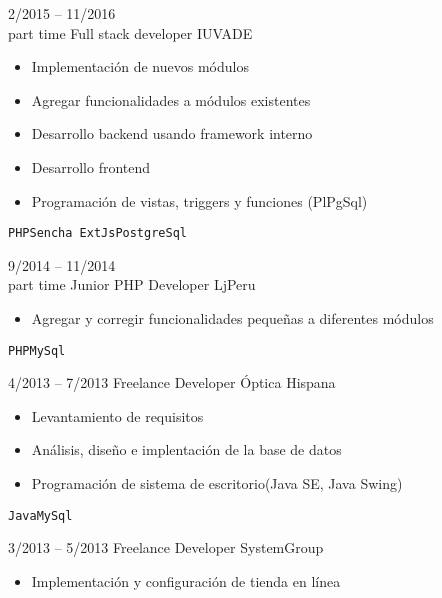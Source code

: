 \begin{entrylist}
{        }
	\entry
		{2/2015 -- 11/2016\\\footnotesize{part time}}
		{Full stack developer}
		{IUVADE}
		{
		    \vspace{-5mm}
    	    \begin{itemize}
    	        \setlength\itemsep{0pt}
    	        \setlength\parskip{0pt}
    	        \item Implementación de nuevos módulos
    	        \item Agregar funcionalidades a módulos existentes
    	        \item Desarrollo backend usando framework interno
    	        \item Desarrollo frontend
    	        \item Programación de vistas, triggers y funciones (PlPgSql)
    	    \end{itemize}
		    \texttt{PHP}\slashsep\texttt{Sencha ExtJs}\slashsep\texttt{PostgreSql}
        }
	\entry
		{9/2014 -- 11/2014\\\footnotesize{part time}}
		{Junior PHP Developer}
		{LjPeru}
		{
		    \vspace{-5mm}
    	    \begin{itemize}
    	        \setlength\itemsep{0pt}
    	        \setlength\parskip{0pt}
    	        \item Agregar y corregir funcionalidades pequeñas a diferentes módulos
    	    \end{itemize}
		    \texttt{PHP}\slashsep\texttt{MySql}
        }
	\entry
		{4/2013 -- 7/2013}
		{Freelance Developer}
		{Óptica Hispana}
		{
		    \vspace{-5mm}
    	    \begin{itemize}
    	        \setlength\itemsep{0pt}
    	        \setlength\parskip{0pt}
    	        \item Levantamiento de requisitos
    	        \item Análisis, diseño e implentación de la base de datos
    	        \item Programación de sistema de escritorio(Java SE, Java Swing)
    	    \end{itemize}
		    \texttt{Java}\slashsep\texttt{MySql}
        }
	\entry
		{3/2013 -- 5/2013}
		{Freelance Developer}
		{SystemGroup}
		{
		    \vspace{-5mm}
		    \begin{itemize}
		        \setlength\itemsep{0pt}
    	        \setlength\parskip{0pt}
		        \item Implementación y configuración de tienda en línea

\end{itemize}}
\end{entrylist}
